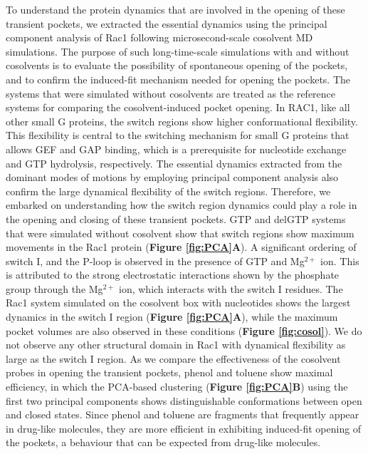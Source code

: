 \documentclass[12pt, a4paper]{achemso}
\begin{document}
To understand the protein dynamics that are involved in the opening of these transient pockets, we extracted the essential dynamics using the principal component analysis of Rac1 following microsecond-scale cosolvent MD simulations. The purpose of such long-time-scale simulations with and without cosolvents is to evaluate the possibility of spontaneous opening of the pockets, and to confirm the induced-fit mechanism needed for opening the pockets. The systems that were simulated without cosolvents are treated as the reference systems for comparing the cosolvent-induced pocket opening.  
In RAC1, like all other small G proteins, the switch regions show higher conformational flexibility. This flexibility is central to the switching mechanism for small G proteins that allows GEF and GAP binding, which is a prerequisite for nucleotide exchange and GTP hydrolysis, respectively.  The essential dynamics extracted from the dominant modes of motions by employing principal component analysis also confirm the large dynamical flexibility of the switch regions. Therefore, we embarked on understanding how the switch region dynamics could play a role in the opening and closing of these transient pockets. GTP and delGTP systems that were simulated without cosolvent show that switch regions show maximum movements in the Rac1 protein (\textbf{Figure \ref{fig:PCA}A}). A significant ordering of switch I, and the P-loop is observed in the presence of GTP and Mg$^{2+}$ ion. This is attributed to the strong electrostatic interactions shown by the phosphate group through the  Mg$^{2+}$ ion, which interacts with the switch I residues. The Rac1 system simulated on the cosolvent box with nucleotides shows the largest dynamics in the switch I region (\textbf{Figure \ref{fig:PCA}A}), while the maximum pocket volumes are also observed in these conditions (\textbf{Figure \ref{fig:cosol}}). We do not observe any other structural domain in Rac1 with dynamical flexibility as large as the switch I region. As we compare the effectiveness of the cosolvent probes in opening the transient pockets, phenol and toluene show maximal efficiency, in which the PCA-based clustering (\textbf{Figure \ref{fig:PCA}B}) using the first two principal components shows distinguishable conformations between open and closed states. Since phenol and toluene are fragments that frequently appear in drug-like molecules, they are more efficient in exhibiting induced-fit opening of the pockets, a behaviour that can be expected from drug-like molecules. 
\end{document}
